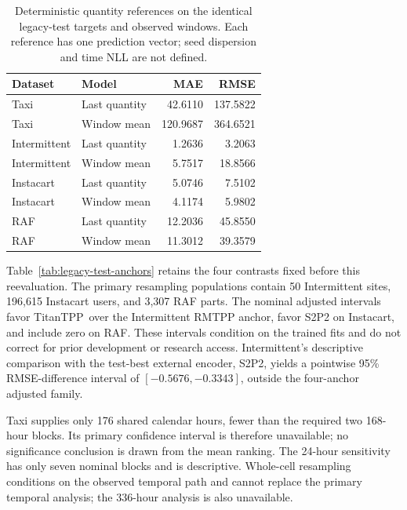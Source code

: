 \documentclass[runningheads]{llncs}
\newcommand{\method}{TitanTPP}
\begin{document}
\begin{table}[t]
\centering\small
\caption{Deterministic quantity references on the identical legacy-test targets and observed windows. Each reference has one prediction vector; seed dispersion and time NLL are not defined.}
\label{tab:legacy-test-simple}
\begin{tabular}{llrr}
\toprule
Dataset & Model & MAE & RMSE \\
\midrule
Taxi & Last quantity & 42.6110 & 137.5822 \\
Taxi & Window mean & 120.9687 & 364.6521 \\
Intermittent & Last quantity & 1.2636 & 3.2063 \\
Intermittent & Window mean & 5.7517 & 18.8566 \\
Instacart & Last quantity & 5.0746 & 7.5102 \\
Instacart & Window mean & 4.1174 & 5.9802 \\
RAF & Last quantity & 12.2036 & 45.8550 \\
RAF & Window mean & 11.3012 & 39.3579 \\
\bottomrule
\end{tabular}
\end{table}

Table~\ref{tab:legacy-test-anchors} retains the four contrasts fixed
before this reevaluation. The primary resampling populations contain 50
Intermittent sites, 196,615 Instacart users, and 3,307 RAF parts. The
nominal adjusted intervals favor \method\ over the Intermittent RMTPP
anchor, favor S2P2 on Instacart, and include zero on RAF. These intervals
condition on the trained fits and do not correct for prior development or
research access. Intermittent's descriptive comparison with the test-best
external encoder, S2P2, yields a pointwise 95\% RMSE-difference interval
of $[-0.5676,-0.3343]$, outside the four-anchor adjusted family.

Taxi supplies only 176 shared calendar hours, fewer than the required two
168-hour blocks. Its primary confidence interval is therefore unavailable;
no significance conclusion is drawn from the mean ranking. The 24-hour
sensitivity has only seven nominal blocks and is descriptive. Whole-cell
resampling conditions on the observed temporal path and cannot replace the
primary temporal analysis; the 336-hour analysis is also unavailable.
\end{document}
